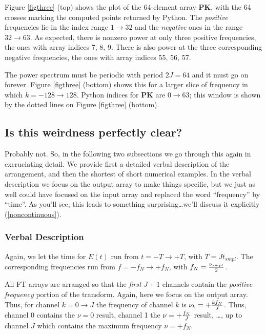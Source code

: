 \documentclass[11pt,preprint]{aastex}
\begin{document}
	Figure \ref{figthree} (top) shows the plot of the 64-element
array {\bf PK}, with the 64 crosses marking the computed points returned
by Python.  The {\it positive} frequencies lie in the index range $1
\rightarrow 32$ and the {\it negative} ones in the range $32 \rightarrow
63$.  As expected, there is nonzero power at only three positive
frequencies, the ones with array indices 7, 8, 9.  There is also power at
the three corresponding negative frequencies, the ones with array indices
55, 56, 57. 

	The power spectrum must be periodic with period $2J = 64$ and it
must go on forever.  Figure \ref{figthree} (bottom) shows this for a
larger slice of frequency in which $k = -128 \rightarrow 128$.  Python
indices for {\bf PK} are $0 \rightarrow 63$; this window is shown by the
dotted lines on Figure \ref{figthree} (bottom). 

\subsection{ Is this weirdness perfectly clear? }

\label{clear}

	Probably not.  So, in the following two subsections we go
through this again in excruciating detail.  We provide first a detailed
verbal description of the arrangement, and then the shortest of short
numerical examples.  In the verbal description we focus on the output
array to make things specific, but we just as well could have focused
on the input array and replaced the word ``frequency'' by ``time''.  As
you'll see, this leads to something surprising\dots we'll discuss it
explicitly (\ref{noncontinuous}).

\subsubsection{Verbal Description}

	Again, we let the time for $E(t)$ run from $t = -T \rightarrow
+T$, with $T = J t_{smpl}$.  The corresponding frequencies run from $f =
-f_N \rightarrow +f_N$, with $f_N = {\nu_{smpl} \over 2}$. 

          All FT arrays are arranged so that the {\it first} $J+1$
channels contain the {\it positive-frequency} portion of the transform. 
Again, here we focus on the output array.  Thus, for channel $k = 0
\rightarrow J$ the frequency of channel $k$ is $\nu _k = +{k f_N \over
J}$.  Thus, channel 0 contains the $\nu =0$ result, channel 1 the $\nu =
+{f_N \over J}$ result, \dots, up to channel $J$ which contains the
maximum frequency $\nu = +f_N$. 
\end{document}
